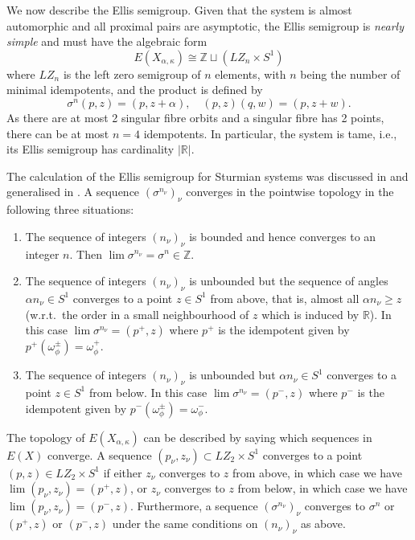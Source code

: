 \documentclass[10pt,a4paper]{amsart}
\numberwithin{equation}{section}
\newcommand{\Z}{\mathbb Z}
\newcommand{\R}{\mathbb{R}}
\newcommand{\al}{\alpha}
\newcommand{\cut}{\kappa}
\begin{document}
We now describe the Ellis semigroup. Given that the system is almost automorphic and all proximal pairs are asymptotic, the Ellis semigroup is {\em nearly simple} \cite{Barge-Kellendonk} and must have the algebraic form
$$E(X_{\al,\cut}) \cong \Z\sqcup ( LZ_n\times S^1) $$
where $LZ_n$ is the left zero semigroup of $n$ elements, with $n$ being the number of minimal idempotents, and the product is defined by
$$ \sigma^n (p,z) = (p,z+\al),\quad (p,z)(q,w) = (p,z+w). $$
As there are at most 2 singular fibre orbits and a singular fibre has 2 points, there can be at most $n=4$ idempotents. In particular, the system is tame, i.e., its Ellis semigroup has cardinality $|\mathbb R|$.
 
The calculation of the Ellis semigroup for Sturmian systems was discussed in \cite[Example 14.10]{GlasnerMegrelishvili2006} and generalised in \cite{Aujogue}.  %
A sequence $(\sigma^{n_\nu})_\nu$ converges in the pointwise topology in the following three situations:
\begin{enumerate}
\item The sequence of integers $(n_\nu)_\nu$ is bounded and hence converges to an integer $n$. Then $\lim \sigma^{n_\nu} = \sigma^n \in \Z$.
\item The sequence of integers $(n_\nu)_\nu$ is unbounded but the sequence of angles $\al n_\nu\in S^1$ converges to a point $z\in S^1$ from above, that is, almost all  $\al n_\nu\geq z$ (w.r.t.\ the order in a small neighbourhood of $z$ which is induced by $\R$). In this case  $\lim \sigma^{n_\nu} = (p^+,z)$ where $p^+$ is the idempotent given by $p^+(\omega_\phi^\pm) = \omega^+_\phi$.
\item The sequence of integers $(n_\nu)_\nu$ is unbounded but $\al n_\nu\in S^1$ converges to a point $z\in S^1$ from below. %
In this case  $\lim \sigma^{n_\nu} = (p^-,z)$ where $p^-$ is the idempotent given by $p^-(\omega_\phi^\pm) = \omega^-_\phi$.
\end{enumerate}
The topology of $E(X_{\al,\cut})$ can be described by saying which sequences in $E(X)$ converge. A sequence $(p_\nu,z_\nu)\subset LZ_2\times S^1$ converges to a point $(p,z)\in LZ_2\times S^1$ if either $z_\nu$ converges to $z$ from above, in which case we have $\lim (p_\nu,z_\nu) = (p^+,z)$, or $z_\nu$ converges to $z$ from below, in which case we have $\lim (p_\nu,z_\nu) = (p^-,z)$. Furthermore, a sequence $(\sigma^{n_\nu})_\nu$ converges to $\sigma^n$ or 
$(p^+,z)$ or $(p^-,z)$ under the same conditions on $(n_\nu)_\nu$ as above. 
\end{document}
